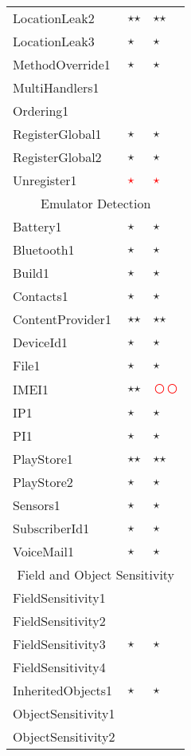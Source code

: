 \documentclass[../draft.tex]{subfiles}
\newcommand{\fp}{\textcolor{white}{\textcircled{\textcolor{red}{$\star$}}}}
\newcommand{\fn}{\textcolor{red}{\textcircled{ }}}
\newcommand{\tp}[0]{\textcircled{$\star$}}
\newcommand{\tsub}[1]{\multicolumn{3}{c}{#1}\\\hline}
\begin{document}
\begin{longtable}{l | l | l}
        LocationLeak2 & \tp \tp & \tp \tp\\
        LocationLeak3 & \tp & \tp\\
        MethodOverride1 & \tp & \tp\\
        MultiHandlers1 & & \\
        Ordering1 & & \\
        RegisterGlobal1 & \tp & \tp\\
        RegisterGlobal2 & \tp & \tp\\
        Unregister1 & \fp & \fp\\
        \hline
        \tsub{Emulator Detection}
        Battery1 & \tp & \tp\\
        Bluetooth1 & \tp & \tp\\
        Build1 & \tp & \tp\\
        Contacts1 & \tp & \tp\\
        ContentProvider1 & \tp \tp & \tp \tp\\
        DeviceId1 & \tp & \tp\\
        File1 & \tp & \tp\\
        IMEI1 & \tp \tp & \fn \fn\\
        IP1 & \tp & \tp\\
        PI1 & \tp & \tp\\
        PlayStore1 & \tp \tp & \tp \tp\\
        PlayStore2 & \tp & \tp\\
        Sensors1 & \tp & \tp\\
        SubscriberId1 & \tp & \tp\\
        VoiceMail1 & \tp & \tp\\
        \hline
        \tsub{Field and Object Sensitivity}
        FieldSensitivity1 & & \\
        FieldSensitivity2 & & \\
        FieldSensitivity3 & \tp & \tp\\
        FieldSensitivity4 & & \\
        InheritedObjects1 & \tp & \tp\\
        ObjectSensitivity1 & & \\
        ObjectSensitivity2 & & \\
        \hline

\end{longtable}
\end{document}
